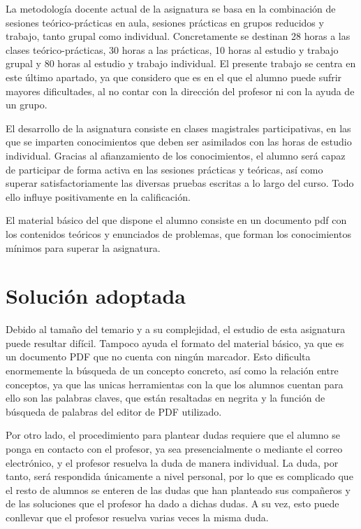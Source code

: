 \documentclass[openright,twoside,10pt]{book}
\begin{document}
    La metodología docente actual de la asignatura se basa en la combinación
    de sesiones teórico-prácticas en aula, sesiones prácticas en grupos
    reducidos y trabajo, tanto grupal como individual. Concretamente se
    destinan 28 horas a las clases teórico-prácticas, 30 horas a las
    prácticas, 10 horas al estudio y trabajo grupal y 80 horas al estudio y
    trabajo individual. El presente trabajo se centra en este último
    apartado, ya que considero que es en el que el alumno puede sufrir
    mayores dificultades, al no contar con la dirección del profesor ni con
    la ayuda de un grupo.
    
    El desarrollo de la asignatura consiste en clases magistrales
    participativas, en las que se imparten conocimientos que deben ser
    asimilados con las horas de estudio individual. Gracias al afianzamiento
    de los conocimientos, el alumno será capaz de participar de forma activa
    en las sesiones prácticas y teóricas, así como superar
    satisfactoriamente las diversas pruebas escritas a lo largo del curso.
    Todo ello influye positivamente en la calificación.
    
    El material básico del que dispone el alumno consiste en un documento
    pdf con los contenidos teóricos y enunciados de problemas, que forman
    los conocimientos mínimos para superar la asignatura.
    
    \section{Solución adoptada}\label{soluciuxf3n-adoptada}
    
    Debido al tamaño del temario y a su complejidad, el estudio de esta
    asignatura puede resultar difícil. Tampoco ayuda el formato del material
    básico, ya que es un documento PDF que no cuenta con ningún marcador.
    Esto dificulta enormemente la búsqueda de un concepto concreto, así como
    la relación entre conceptos, ya que las unicas herramientas con la que
    los alumnos cuentan para ello son las palabras claves, que están
    resaltadas en negrita y la función de búsqueda de palabras del editor de
    PDF utilizado.
    
    Por otro lado, el procedimiento para plantear dudas requiere que el
    alumno se ponga en contacto con el profesor, ya sea presencialmente o
    mediante el correo electrónico, y el profesor resuelva la duda de manera
    individual. La duda, por tanto, será respondida únicamente a nivel
    personal, por lo que es complicado que el resto de alumnos se enteren de
    las dudas que han planteado sus compañeros y de las soluciones que el
    profesor ha dado a dichas dudas. A su vez, esto puede conllevar que el
    profesor resuelva varias veces la misma duda.
    
\end{document}
